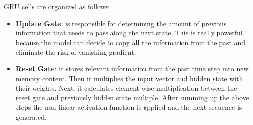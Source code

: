 GRU cells are organized as follows:
\begin{itemize}
    \item \textbf{Update Gate}: is responsible for determining the amount of previous information that 
        needs to pass along the next state. This is really powerful because the model can decide to 
        copy all the information from the past and eliminate the risk of vanishing gradient;
    \item \textbf{Reset Gate}: it stores relevant information from the past time step into new memory
        content. Then it multiplies the input vector and hidden state with their weights. Next, it 
        calculates element-wise multiplication between the reset gate and previously hidden state 
        multiple. After summing up the above steps the non-linear activation function is applied and 
        the next sequence is generated. 
\end{itemize}